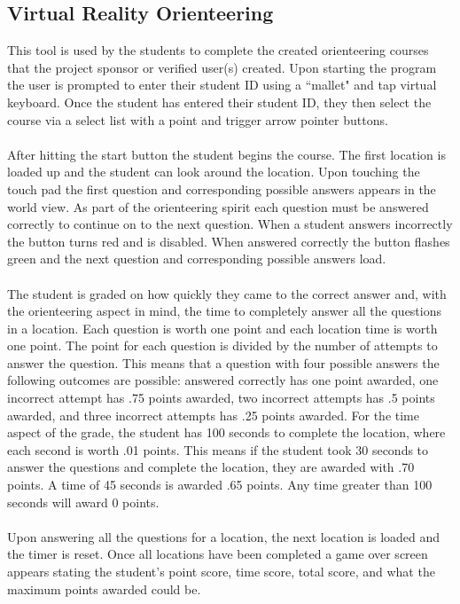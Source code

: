 \subsection{Virtual Reality Orienteering}
This tool is used by the students to complete the created orienteering courses that the project sponsor or verified user(s) created. Upon starting the program the user is prompted to enter their student ID using a ``mallet" and tap virtual keyboard. Once the student has entered their student ID, they then select the course via a select list with a point and trigger arrow pointer buttons. \\
\\
After hitting the start button the student begins the course. The first location is loaded up and the student can look around the location. Upon touching the touch pad the first question and corresponding possible answers appears in the world view. As part of the orienteering spirit each question must be answered correctly to continue on to the next question. When a student answers incorrectly the button turns red and is disabled. When answered correctly the button flashes green and the next question and corresponding possible answers load. \\
\\
The student is graded on how quickly they came to the correct answer and, with the orienteering aspect in mind, the time to completely answer all the questions in a location. Each question is worth one point and each location time is worth one point. The point for each question is divided by the number of attempts to answer the question. This means that a question with four possible answers the following outcomes are possible: answered correctly has one point awarded, one incorrect attempt has .75 points awarded, two incorrect attempts has .5 points awarded, and three incorrect attempts has .25 points awarded. For the time aspect of the grade, the student has 100 seconds to complete the location, where each second is worth .01 points. This means if the student took 30 seconds to answer the questions and complete the location, they are awarded with .70 points. A time of 45 seconds is awarded .65 points. Any time greater than 100 seconds will award 0 points.\\
\\
Upon answering all the questions for a location, the next location is loaded and the timer is reset. Once all locations have been completed a game over screen appears stating the student's point score, time score, total score, and what the maximum points awarded could be. 
\clearpage
